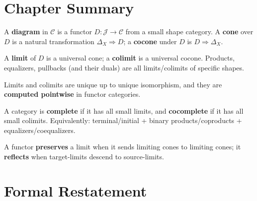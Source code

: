 \section*{Chapter Summary}

\begin{summarybox}
A \textbf{diagram} in $\mathcal{C}$ is a functor $D : \mathcal{J} \to
\mathcal{C}$ from a small shape category. A \textbf{cone} over $D$ is a
natural transformation $\Delta_X \Rightarrow D$; a \textbf{cocone} under
$D$ is $D \Rightarrow \Delta_X$.

A \textbf{limit} of $D$ is a universal cone; a \textbf{colimit} is a
universal cocone. Products, equalizers, pullbacks (and their duals)
are all limits/colimits of specific shapes.

Limits and colimits are unique up to unique isomorphism, and they are
\textbf{computed pointwise} in functor categories.

A category is \textbf{complete} if it has all small limits, and
\textbf{cocomplete} if it has all small colimits. Equivalently:
terminal/initial + binary products/coproducts + equalizers/coequalizers.

A functor \textbf{preserves} a limit when it sends limiting cones to
limiting cones; it \textbf{reflects} when target-limits descend to
source-limits.
\end{summarybox}


\section*{Formal Restatement}

